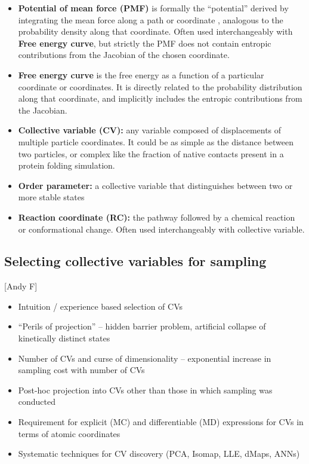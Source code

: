 \documentclass[9pt]{livecoms}
\begin{document}
\begin{itemize}

  \item \textbf{Potential of mean force (PMF)} is formally the ``potential'' derived by integrating the mean force along a path or coordinate \cite{Kirkwood-1935}, analogous to the probability density along that coordinate.  Often used interchangeably with \textbf{Free energy curve}, but strictly the PMF does not contain entropic contributions from the Jacobian of the chosen coordinate.

  \item \textbf{Free energy curve} is the free energy as a function of a
  particular coordinate or coordinates.  It is directly related to the
  probability distribution along that coordinate, and implicitly includes the
  entropic contributions from the Jacobian.


  \item \textbf{Collective variable (CV):} any variable composed of displacements of
  multiple particle coordinates.  It could be as simple as the distance between
  two particles, or complex like the fraction of native contacts present in a
  protein folding simulation.

  \item \textbf{Order parameter:}  a collective variable that distinguishes between two or more stable states

  \item \textbf{Reaction coordinate (RC):} the pathway followed by a chemical reaction or conformational change.  Often used interchangeably with collective variable.

\end{itemize}

\subsection{Selecting collective variables for sampling}

[Andy F]

\begin{itemize}
\item Intuition / experience based selection of CVs
\item ``Perils of projection'' -- hidden barrier problem, artificial collapse of kinetically distinct states
\item Number of CVs and curse of dimensionality -- exponential increase in sampling cost with number of CVs
\item Post-hoc projection into CVs other than those in which sampling was conducted \cite{ferguson2017bayeswham}
\item Requirement for explicit (MC) and differentiable (MD) expressions for CVs in terms of atomic coordinates
\item Systematic techniques for CV discovery (PCA, Isomap, LLE, dMaps, ANNs)
\end{itemize}
\end{document}
